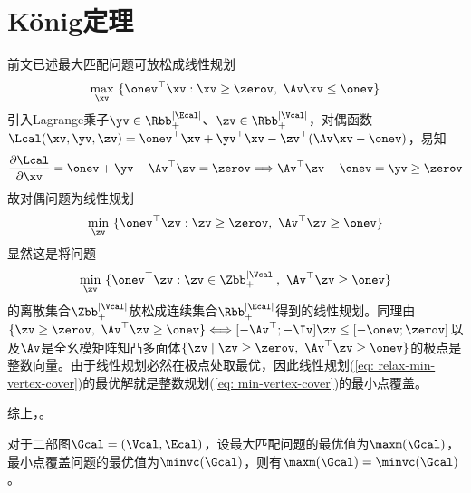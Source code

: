 \documentclass{ctexart}
\begin{document}
\section{König定理}

前文已述最大匹配问题可放松成线性规划
\begin{align*}
    \max_{\xv} ~ \{ \onev^\top \xv : \xv \ge \zerov, ~ \Av \xv \le \onev \}
\end{align*}
引入Lagrange乘子$\yv \in \Rbb_+^{|\Ecal|}$、$\zv \in \Rbb_+^{|\Vcal|}$，对偶函数$\Lcal(\xv, \yv, \zv) = \onev^\top \xv + \yv^\top \xv - \zv^\top (\Av \xv - \onev)$，易知
\begin{align*}
    \frac{\partial \Lcal}{\partial \xv} = \onev + \yv - \Av^\top \zv = \zerov \Longrightarrow \Av^\top \zv - \onev = \yv \geq \zerov
\end{align*}
故对偶问题为线性规划
\begin{align} \label{eq: relax-min-vertex-cover}
    \min_{\zv} ~ \{ \onev^\top \zv : \zv \ge \zerov, ~ \Av^\top \zv \ge \onev \}
\end{align}
显然这是将问题
\begin{align} \label{eq: min-vertex-cover}
    \min_{\zv} ~ \{ \onev^\top \zv : \zv \in \Zbb_+^{|\Vcal|}, ~ \Av^\top \zv \ge \onev \}
\end{align}
的离散集合$\Zbb_+^{|\Vcal|}$放松成连续集合$\Rbb_+^{|\Ecal|}$得到的线性规划。同理由$\{ \zv \ge \zerov, ~ \Av^\top \zv \ge \onev \} \Longleftrightarrow [-\Av^\top; -\Iv] \zv \le [-\onev; \zerov]$以及$\Av$是全幺模矩阵知凸多面体$\{ \zv \mid \zv \ge \zerov, ~ \Av^\top \zv \ge \onev \}$的极点是整数向量。由于线性规划必然在极点处取最优，因此线性规划(\ref{eq: relax-min-vertex-cover})的最优解就是整数规划(\ref{eq: min-vertex-cover})的最小点覆盖。

综上，。

\begin{theorem} [König]
    对于二部图$\Gcal = (\Vcal, \Ecal)$，设最大匹配问题的最优值为$\maxm(\Gcal)$，最小点覆盖问题的最优值为$\minvc(\Gcal)$，则有$\maxm(\Gcal) = \minvc(\Gcal)$。
\end{theorem}
\end{document}
